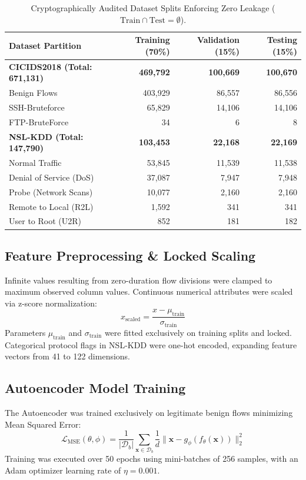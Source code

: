 \documentclass[12pt,a4paper]{report}
\begin{document}
\begin{table}[H]
\centering
\caption{Cryptographically Audited Dataset Splits Enforcing Zero Leakage ($\text{Train} \cap \text{Test} = \emptyset$).}
\label{tab:ch5_splits}
\small
\renewcommand{\arraystretch}{1.15}
\begin{tabularx}{\columnwidth}{|Y|r|r|r|}
\hline
\textbf{Dataset Partition} & \textbf{Training (70\%)} & \textbf{Validation (15\%)} & \textbf{Testing (15\%)} \\
\hline
\textbf{CICIDS2018 (Total: 671,131)} & \textbf{469,792} & \textbf{100,669} & \textbf{100,670} \\
\quad Benign Flows & 403,929 & 86,557 & 86,556 \\
\quad SSH-Bruteforce & 65,829 & 14,106 & 14,106 \\
\quad FTP-BruteForce & 34 & 6 & 8 \\
\hline
\textbf{NSL-KDD (Total: 147,790)} & \textbf{103,453} & \textbf{22,168} & \textbf{22,169} \\
\quad Normal Traffic & 53,845 & 11,539 & 11,538 \\
\quad Denial of Service (DoS) & 37,087 & 7,947 & 7,948 \\
\quad Probe (Network Scans) & 10,077 & 2,160 & 2,160 \\
\quad Remote to Local (R2L) & 1,592 & 341 & 341 \\
\quad User to Root (U2R) & 852 & 181 & 182 \\
\hline
\end{tabularx}
\end{table}

\subsection{Feature Preprocessing \& Locked Scaling}
Infinite values resulting from zero-duration flow divisions were clamped to maximum observed column values. Continuous numerical attributes were scaled via z-score normalization:
\begin{equation}
x_{\text{scaled}} = \frac{x - \mu_{\text{train}}}{\sigma_{\text{train}}}
\label{eq:ch5_zscore}
\end{equation}
Parameters $\mu_{\text{train}}$ and $\sigma_{\text{train}}$ were fitted exclusively on training splits and locked. Categorical protocol flags in NSL-KDD were one-hot encoded, expanding feature vectors from 41 to 122 dimensions.

\subsection{Autoencoder Model Training}
The Autoencoder was trained exclusively on legitimate benign flows minimizing Mean Squared Error:
\begin{equation}
\mathcal{L}_{\text{MSE}}(\theta, \phi) = \frac{1}{|\mathcal{D}_b|}\sum_{\mathbf{x} \in \mathcal{D}_b} \frac{1}{d}\|\mathbf{x} - g_\phi(f_\theta(\mathbf{x}))\|_2^2
\label{eq:ch5_mse}
\end{equation}
Training was executed over 50 epochs using mini-batches of 256 samples, with an Adam optimizer learning rate of $\eta = 0.001$.
\end{document}
